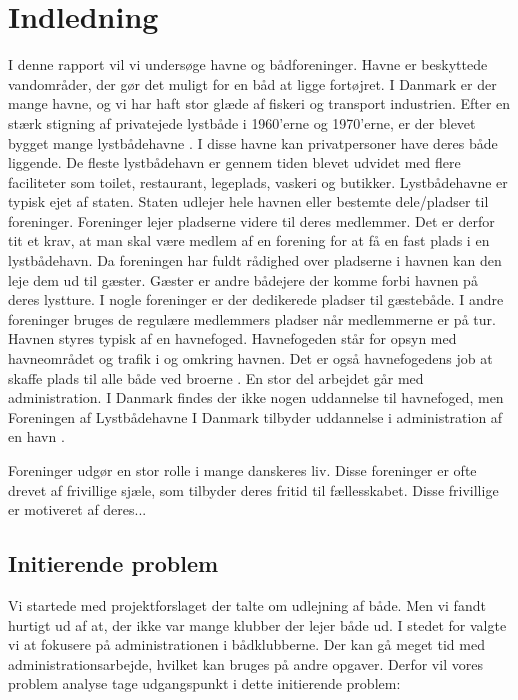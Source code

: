 \chapter{Indledning}
I denne rapport vil vi undersøge havne og bådforeninger. Havne er beskyttede vandområder, der gør det muligt for en båd at ligge fortøjret. I Danmark er der mange havne, og vi har haft stor glæde af fiskeri og transport industrien. Efter en stærk stigning af privatejede lystbåde i 1960'erne og 1970'erne, er der blevet bygget mange lystbådehavne \cite{gyldendal_redaktionen_havn_2013}. I disse havne kan privatpersoner have deres både liggende. De fleste lystbådehavn er gennem tiden blevet udvidet med flere faciliteter som toilet, restaurant, legeplads, vaskeri og butikker. Lystbådehavne er typisk ejet af staten. Staten udlejer hele havnen eller bestemte dele/pladser til foreninger. Foreninger lejer pladserne videre til deres medlemmer. Det er derfor tit et krav, at man skal være medlem af en forening for at få en fast plads i en lystbådehavn. Da foreningen har fuldt rådighed over pladserne i havnen kan den leje dem ud til gæster. Gæster er andre bådejere der komme forbi havnen på deres lystture. I nogle foreninger er der dedikerede pladser til gæstebåde. I andre foreninger bruges de regulære medlemmers pladser når medlemmerne er på tur.
Havnen styres typisk af en havnefoged. Havnefogeden står for opsyn med havneområdet og trafik i og omkring havnen. Det er også havnefogedens job at skaffe plads til alle både ved broerne \cite{undervisningsministeriet_havnefoged_2014}. En stor del arbejdet går med administration. I Danmark findes der ikke nogen uddannelse til havnefoged, men Foreningen af Lystbådehavne I Danmark tilbyder uddannelse i administration af en havn \cite{lystbadehavne_i_danmark}.

Foreninger udgør en stor rolle i mange danskeres liv. Disse foreninger er ofte drevet af frivillige sjæle, som tilbyder deres fritid til fællesskabet. Disse frivillige er motiveret af deres... 

\section{Initierende problem}
Vi startede med projektforslaget der talte om udlejning af både. Men vi fandt hurtigt ud af at, der ikke var mange klubber der lejer både ud. I stedet for valgte vi at fokusere på administrationen i bådklubberne. Der kan gå meget tid med administrationsarbejde, hvilket kan bruges på andre opgaver. Derfor vil vores problem analyse tage udgangspunkt i dette initierende problem:

